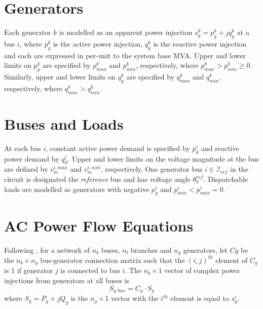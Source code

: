 \section{Generators}
\label{sec:generators}
Each generator $k$ is modelled as an apparent power injection $s^k_g = p^k_g +
jq^k_g$ at a bus $i$, where $p^k_g$ is the active power injection,
$q^k_g$ is the reactive power injection and each are expressed in per-unit to
the system base MVA.  Upper and lower limits on $p^k_g$ are specified by
$p^k_{max}$ and $p^k_{min}$, respectively, where $p^k_{max} > p^k_{min} \geq
0$.  Similarly, upper and lower limits on $q^k_g$ are specified by $q_{max}^k$
and $q_{min}^k$, respectively, where $q^k_{max} > q^k_{min}$.

\section{Buses and Loads}
At each bus $i$, constant active power demand is specified by $p^i_d$ and
reactive power demand by $q^i_d$.  Upper and lower limits on the voltage
magnitude at the bus are defined by $v_m^{i,max}$ and $v_m^{i,min}$,
respectively.  One generator bus $i \in \mathcal{I}_{ref}$ in the circuit is
designated the \textit{reference} bus and has voltage angle $\theta^{ref}_k$.
Dispatchable loads are modelled as generators with negative $p^i_g$ and
$p^i_{min} < p^i_{max} = 0$. %

\section{AC Power Flow Equations}
\label{sec:acpf}
Following \cite[p.13]{pserc:mp_manual}, for a network of $n_b$ buses, $n_l$
branches and $n_g$ generators, let $Cg$ be the $n_b \times n_g$ bus-generator connection matrix such that the $(i,j)^{th}$
element of $C_{g}$ is $1$ if generator $j$ is connected to bus $i$.  The
$n_b \times 1$ vector of complex power injections from generators at all buses
is
\begin{equation}
S_{g,bus} = C_g \cdot S_g
\end{equation}
where $S_g = P_g + jQ_g$ is the $n_g \times 1$ vector with the $i^{th}$ element
is equal to $s^i_g$.

